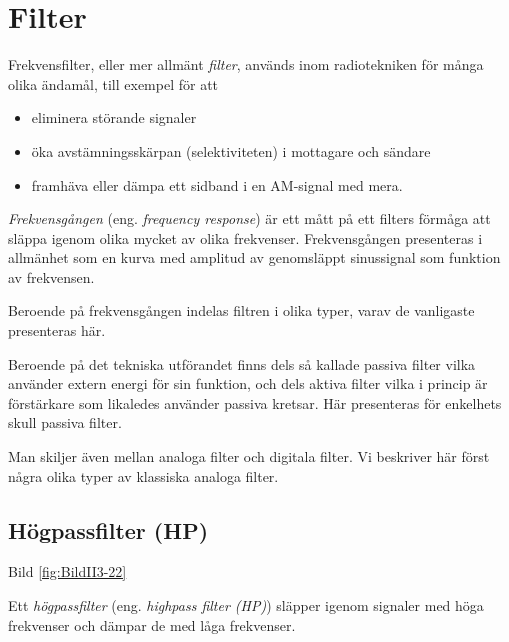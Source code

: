 \section{Filter}

Frekvensfilter, eller mer allmänt \emph{filter}, används inom radiotekniken för
många olika ändamål, till exempel för att
\begin{itemize}
  \item eliminera störande signaler
  \item öka avstämningsskärpan (selektiviteten) i mottagare och sändare
  \item framhäva eller dämpa ett sidband i en AM-signal med mera.
\end{itemize}

\emph{Frekvensgången} (eng. \emph{frequency response}) är ett mått på ett
filters förmåga att släppa igenom olika mycket av olika frekvenser.
Frekvensgången presenteras i allmänhet som en kurva med amplitud av genomsläppt
sinussignal som funktion av frekvensen.

Beroende på frekvensgången indelas filtren i olika typer, varav de vanligaste presenteras här.

Beroende på det tekniska utförandet finns dels så kallade passiva filter vilka
använder extern energi för sin funktion, och dels aktiva filter vilka i princip
är förstärkare som likaledes använder passiva kretsar.
Här presenteras för enkelhets skull passiva filter.

Man skiljer även mellan analoga filter och digitala filter. Vi beskriver här först några olika typer av klassiska analoga filter.

\subsection{Högpassfilter (HP)}


Bild \ref{fig:BildII3-22}

Ett \emph{högpassfilter} (eng. \emph{highpass filter (HP)}) släpper igenom
signaler med höga frekvenser och dämpar de med låga frekvenser.

